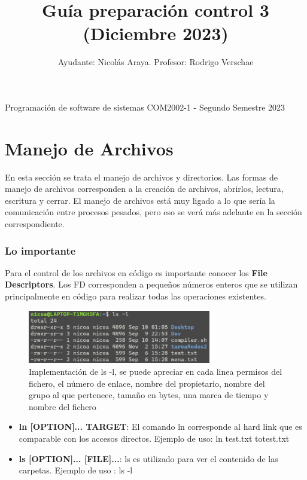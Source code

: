 \documentclass[journal]{IEEEtai}
\begin{document}
\title{Guía preparación control 3  (Diciembre 2023)} 


\author{Ayudante: Nicolás Araya. Profesor: Rodrigo Verschae}

{Programación de software de sistemas COM2002-1 - Segundo Semestre 2023}
\maketitle

\section{\textbf{Manejo de Archivos}}

En esta sección se trata el manejo de archivos y directorios. Las formas de manejo de archivos corresponden a la creación de archivos, abrirlos, lectura, escritura y cerrar. El manejo de archivos está muy ligado a lo que sería la comunicación entre procesos pesados, pero eso se verá más adelante en la sección correspondiente.

\subsubsection{\textbf{Lo importante}} Para el control de los archivos en código es importante conocer los \textbf{File Descriptors}. Los FD corresponden a pequeños números enteros que se utilizan principalmente en código para realizar todas las operaciones existentes.

\begin{figure}[!h]
\centering
\includegraphics[width=8cm]{img/inode.png}
\caption{Implementación de ls -l, se puede apreciar en cada linea permisos del fichero, el número de enlace, nombre del propietario, nombre del grupo al que pertenece, tamaño en bytes, una marca de tiempo y nombre del fichero}
\label{fig}
\end{figure}

\begin{itemize}
\item	\textbf{ln [OPTION]... TARGET}: El comando ln corresponde al hard link que es comparable con los accesos directos. Ejemplo de uso: ln test.txt totest.txt
\item	\textbf{ls [OPTION]... [FILE]...}: ls es utilizado para ver el contenido de las carpetas. Ejemplo de uso : ls -l
\end{itemize}
\end{document}
